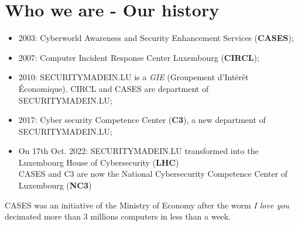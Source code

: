 %
%
\section*{Who we are - Our history}
\begin{frame}
  \begin{center}
    \begin{itemize}
      \item 2003: Cyberworld Awareness and Security Enhancement Services (\textbf{CASES});
      \item 2007: Computer Incident Response Center Luxembourg (\textbf{CIRCL});
      \item 2010: SECURITYMADEIN.LU is a \textit{GIE} (Groupement d’Intérêt Économique). CIRCL and CASES are department of SECURITYMADEIN.LU;
      \item 2017: Cyber security Competence Center (\textbf{C3}), a new department of SECURITYMADEIN.LU;
      \item On 17th Oct. 2022: SECURITYMADEIN.LU transformed into the Luxembourg House of Cybersecurity (\textbf{LHC})\\
        CASES and C3 are now the National Cybersecurity Competence Center of Luxembourg (\textbf{NC3})
    \end{itemize}
  \end{center}
  CASES was an initiative of the Ministry of Economy after the worm
  \textit{I love you} decimated more than 3 millions computers in less than a week.
\end{frame}

%
%

